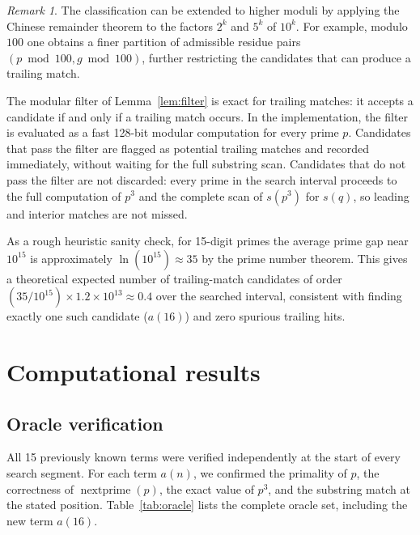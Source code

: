 \documentclass[12pt,reqno]{article}
\theoremstyle{plain}
\theoremstyle{definition}
\theoremstyle{remark}
\newtheorem{remark}[theorem]{Remark}
\newcommand{\np}{\operatorname{nextprime}}
\begin{document}
\begin{remark}
The classification can be extended to higher moduli by applying the
Chinese remainder theorem to the factors $2^k$ and $5^k$ of $10^k$.
For example, modulo $100$ one obtains a finer partition of admissible
residue pairs $(p \bmod 100, g \bmod 100)$, further restricting the
candidates that can produce a trailing match.
\end{remark}

The modular filter of Lemma~\ref{lem:filter} is exact for trailing
matches: it accepts a candidate if and only if a trailing match
occurs.
In the implementation, the filter is evaluated as a fast 128-bit
modular computation for every prime $p$.
Candidates that pass the filter are flagged as potential trailing
matches and recorded immediately, without waiting for the full
substring scan.
Candidates that do not pass the filter are not discarded: every prime
in the search interval proceeds to the full computation of $p^3$ and
the complete scan of $s(p^3)$ for $s(q)$, so leading and interior
matches are not missed.

As a rough heuristic sanity check, for 15-digit primes the average
prime gap near $10^{15}$ is approximately $\ln(10^{15}) \approx 35$
by the prime number theorem.
This gives a theoretical expected number of trailing-match candidates
of order $(35 / 10^{15}) \times 1.2 \times 10^{13} \approx 0.4$
over the searched interval, consistent with finding exactly one such
candidate ($a(16)$) and zero spurious trailing hits.

\section{Computational results}
\label{sec:results}

\subsection{Oracle verification}
\label{sec:oracle}

All 15 previously known terms were verified independently at the start
of every search segment.
For each term $a(n)$, we confirmed the primality of $p$, the
correctness of $\np(p)$, the exact value of $p^3$, and the substring
match at the stated position.
Table~\ref{tab:oracle} lists the complete oracle set, including the
new term $a(16)$.
\end{document}
